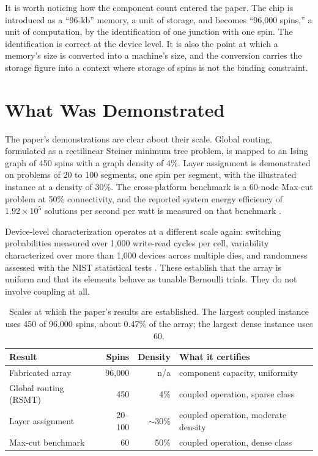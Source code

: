 \documentclass[11pt]{article}
\theoremstyle{definition}
\theoremstyle{remark}
\begin{document}
It is worth noticing how the component count entered the paper. The chip is introduced as a ``96-kb'' memory, a unit of storage, and becomes ``96,000 spins,'' a unit of computation, by the identification of one junction with one spin. The identification is correct at the device level. It is also the point at which a memory's size is converted into a machine's size, and the conversion carries the storage figure into a context where storage of spins is not the binding constraint.

\section{What Was Demonstrated}

The paper's demonstrations are clear about their scale. Global routing, formulated as a rectilinear Steiner minimum tree problem, is mapped to an Ising graph of 450 spins with a graph density of 4\%. Layer assignment is demonstrated on problems of 20 to 100 segments, one spin per segment, with the illustrated instance at a density of 30\%. The cross-platform benchmark is a 60-node Max-cut problem at 50\% connectivity, and the reported system energy efficiency of $1.92 \times 10^5$ solutions per second per watt is measured on that benchmark \cite{li2026}.

Device-level characterization operates at a different scale again: switching probabilities measured over 1,000 write-read cycles per cell, variability characterized over more than 1,000 devices across multiple dies, and randomness assessed with the NIST statistical tests \cite{li2026}. These establish that the array is uniform and that its elements behave as tunable Bernoulli trials. They do not involve coupling at all.

\begin{table}[h]
\centering
\small
\begin{tabular}{lrrl}
\toprule
Result & Spins & Density & What it certifies \\
\midrule
Fabricated array & 96,000 & n/a & component capacity, uniformity \\
Global routing (RSMT) & 450 & 4\% & coupled operation, sparse class \\
Layer assignment & 20--100 & $\sim$30\% & coupled operation, moderate density \\
Max-cut benchmark & 60 & 50\% & coupled operation, dense class \\
\bottomrule
\end{tabular}
\caption{Scales at which the paper's results are established. The largest coupled instance uses 450 of 96,000 spins, about 0.47\% of the array; the largest dense instance uses 60.}
\label{tab:scales}
\end{table}
\end{document}
